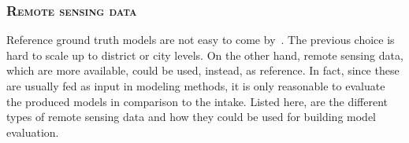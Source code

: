         \subsubsection{\textsc{Remote sensing data}}
            Reference ground truth models are not easy to come by~\parencite{schuster2003new}.
            The previous choice is hard to scale up to district or city levels.
            On the other hand, remote sensing data, which are more available, could be used, instead, as reference.
            In fact, since these are usually fed as input in modeling methods, it is only reasonable to evaluate the produced models in comparison to the intake.
            Listed here, are the different types of remote sensing data and how they could be used for building model evaluation.\\

